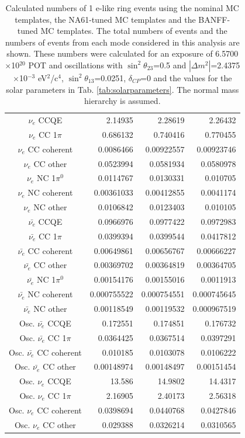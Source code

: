 \begin{table}
\begin{tabular}{| c |  D{.}{.}{-1} |  D{.}{.}{-1} |  D{.}{.}{-1} | }
$\nu_e$ CCQE & 2.14935 & 2.28619 & 2.26432 \\ 
$\nu_e$ CC 1$\pi$ & 0.686132 & 0.740416 & 0.770455 \\ 
$\nu_e$ CC coherent & 0.0086466 & 0.00922557 & 0.00923746 \\ 
$\nu_e$ CC other & 0.0523994 & 0.0581934 & 0.0580978 \\ 
$\nu_e$ NC 1$\pi^0$ & 0.0114767 & 0.0130331 & 0.010705 \\ 
$\nu_e$ NC coherent & 0.00361033 & 0.00412855 & 0.0041174 \\ 
$\nu_e$ NC other & 0.0106842 & 0.0123403 & 0.010105 \\ 
$\bar{\nu_e}$ CCQE & 0.0966976 & 0.0977422 & 0.0972983 \\ 
$\bar{\nu_e}$ CC 1$\pi$ & 0.0399394 & 0.0399544 & 0.0417812 \\ 
$\bar{\nu_e}$ CC coherent & 0.00649861 & 0.00656767 & 0.00666227 \\ 
$\bar{\nu_e}$ CC other & 0.00369702 & 0.00364819 & 0.00364705 \\ 
$\bar{\nu_e}$ NC 1$\pi^0$ & 0.00154176 & 0.00155016 & 0.0011913 \\ 
$\bar{\nu_e}$ NC coherent & 0.000755522 & 0.000754551 & 0.000745645 \\ 
$\bar{\nu_e}$ NC other & 0.00118549 & 0.00119532 & 0.000967519 \\ 
Osc. $\bar{\nu_e}$ CCQE & 0.172551 & 0.174851 & 0.176732 \\ 
Osc. $\bar{\nu_e}$ CC 1$\pi$ & 0.0364425 & 0.0367514 & 0.0397291 \\ 
Osc. $\bar{\nu_e}$ CC coherent & 0.010185 & 0.0103078 & 0.0106222 \\ 
Osc. $\bar{\nu_e}$ CC other & 0.00148974 & 0.00148497 & 0.00151454 \\ 
Osc. $\nu_e$ CCQE & 13.586 & 14.9802 & 14.4317 \\ 
Osc. $\nu_e$ CC 1$\pi$ & 2.16905 & 2.40173 & 2.56318 \\ 
Osc. $\nu_e$ CC coherent & 0.0398694 & 0.0440768 & 0.0427846 \\ 
Osc. $\nu_e$ CC other & 0.029388 & 0.0326214 & 0.0310565 \\ 
\hline
\end{tabular}
\caption{
Calculated numbers of 1 e-like ring events using the nominal MC templates, the NA61-tuned MC templates
and the BANFF-tuned MC templates.
The total numbers of events and the numbers of events from each mode considered in this analysis are shown.
These numbers were calculated for an exposure of 6.5700$\times$10$^{20}$ POT
and oscillations with $\sin^{2}\theta_{23}$=0.5 and $|\Delta m^{2}|$=2.4375$\times$10$^{-3}$ eV$^{2}$/c$^{4}$,
$\sin^{2}\theta_{13}$=0.0251, $\delta_{CP}$=0 and the values for the solar parameters in Tab. \ref{tab:solarparameters}.
The normal mass hierarchy is assumed.
}
\label{tab:nsk_nominal_osc_1Re}
\end{table}
